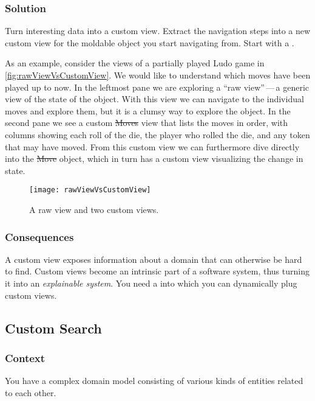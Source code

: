 \documentclass[sigconf]{acmart}
\renewcommand{\nbc}[3]{} %
\newcommand\eog[1]{\nbc{Edward}{#1}{purple}}
\newcommand{\pattern}[1]{\emph{\nameref{pat:#1}}\xspace}
\begin{document}
\subsubsection*{Solution}
Turn interesting data into a custom view.
Extract the navigation steps into a new custom view for the moldable object you start navigating from.
Start with a \pattern{simpleView}.

\eog{I'd love to see maybe a picture like a figure with this.}

As an example, consider the views of a partially played Ludo game in \autoref{fig:rawViewVsCustomView}.
We would like to understand which moves have been played up to now.
In the leftmost pane we are exploring a ``raw view''\,---\,a generic view of the state of the object.
With this view we can navigate to the individual moves and explore them, but it is a clumsy way to explore the object.
In the second pane we see a custom \st{Moves} view that lists the moves in order, with columns showing each roll of the die, the player who rolled the die, and any token that may have moved.
From this custom view we can furthermore dive directly into the \st{Move} object, which in turn has a custom view visualizing the change in state.

\begin{figure}[h]
  \texttt{[image: rawViewVsCustomView]}
  \caption{A raw view and two custom views.}
  \label{fig:rawViewVsCustomView}
\end{figure}

\subsubsection*{Consequences}
A custom view exposes information about a domain that can otherwise be hard to find.
Custom views become an intrinsic part of a software system, thus turning it into an \emph{explainable system}.
You need a \pattern{moldableTool} into which you can dynamically plug custom views.

\eog{Down here, there's mention of what a you need a moldable tool, but I still don't understand what a moldable tool is given just this paper so far.}

\subsection*{Custom Search}\label{pat:customSearch}
\subsubsection*{Context}
You have a complex domain model consisting of various kinds of entities related to each other.
\end{document}
